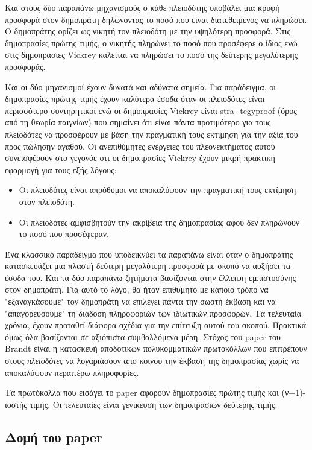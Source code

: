 \documentclass[letterpaper,11pt]{article}
\begin{document}
Και στους δύο παραπάνω μηχανισμούς ο κάθε πλειοδότης υποβάλει μια κρυφή προσφορά στον δημοπράτη δηλώνοντας το
ποσό που είναι διατεθειμένος να πληρώσει. Ο δημοπράτης ορίζει ως νικητή τον πλειοδότη με την υψηλότερη
προσφορά. Στις δημοπρασίες πρώτης τιμής, ο νικητής πληρώνει το ποσό που προσέφερε ο ίδιος ενώ στις δημοπρασίες
Vickrey καλείται να πληρώσει το ποσό της δεύτερης μεγαλύτερης προσφοράς.

Και οι δύο μηχανισμοί έχουν δυνατά και αδύνατα σημεία. Για παράδειγμα, οι δημοπρασίες πρώτης τιμής έχουν
καλύτερα έσοδα όταν οι πλειοδότες είναι περισσότερο συντηρητικοί ενώ οι δημοπρασίες Vickrey είναι
stra- tegyproof (όρος από τη θεωρία παιγνίων) που σημαίνει ότι είναι πάντα προτιμότερο για τους πλειοδότες να
προσφέρουν με βάση την πραγματική τους εκτίμηση για την αξία του προς πώλησην αγαθού. Οι ανεπιθύμητες
ενέργειες του πλεονεκτήματος αυτού συνεισφέρουν στο γεγονόε οτι οι δημοπρασίες Vickrey έχουν μικρή πρακτική
εφαρμογή για τους εξής λόγους:

\begin{itemize}
	\item Οι πλειοδότες είναι απρόθυμοι να αποκαλύψουν την πραγματική τους εκτίμηση στον πλειοδότη. 
	\item Οι πλειοδότες αμφισβητούν την ακρίβεια της δημοπρασίας αφού δεν πληρώνουν το ποσό που προσέφεραν.
\end{itemize}

Ένα κλασσικό παράδειγμα που υποδεικνύει τα παραπάνω είναι όταν ο δημοπράτης κατασκευάζει μια πλαστή δεύτερη
μεγαλύτερη προσφορά με σκοπό να αυξήσει τα έσοδα του. Και τα δύο παραπάνω ζητήματα βασίζονται στην έλλειψη
εμπιστοσύνης στον δημοπράτη. Για αυτό το λόγο, θα ήταν επιθυμητό με κάποιο τρόπο να "εξαναγκάσουμε" τον
δημοπράτη να επιλέγει πάντα την σωστή έκβαση και να "απαγορεύσουμε" τη διάδοση πληροφοριών των ιδιωτικών
προσφορών. Τα τελευταία χρόνια, έχουν προταθεί διάφορα σχέδια για την επίτευξη αυτού του σκοπού. Πρακτικά όμως
όλα βασίζονται σε αξιόπιστα συμβαλλόμενα μέρη. Στόχος του paper του Brandt είναι η κατασκευή αποδοτικών
πολυκομματικών πρωτοκόλλων που επιτρέπουν στους \emph{πλειοδότες} να λογαριάσουν απο κοινού την έκβαση της
δημοπρασίας χωρίς να αποκαλύψουν περαιτέρω πληροφορίες.

Τα πρωτόκολλα που εισάγει το paper αφορούν δημοπρασίες πρώτης τιμής και (ν+1)-ιοστής τιμής. Οι τελευταίες
είναι γενίκευση των δημοπρασιών δεύτερης τιμής.

\subsection{Δομή του paper}
\end{document}
